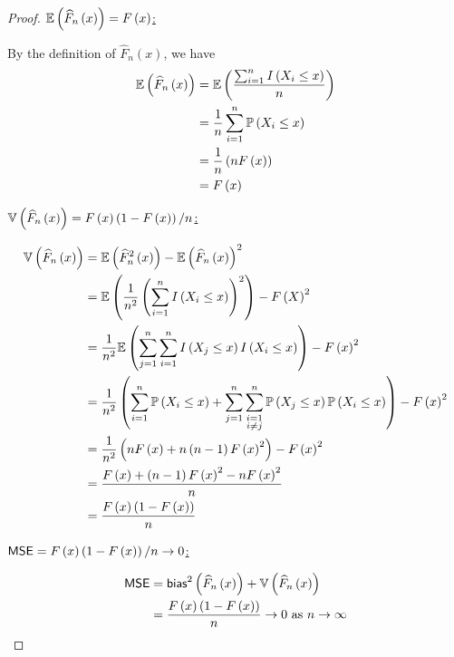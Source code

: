 \documentclass[a4paper]{article}
\begin{document}
\begin{proof}[Proof] 
\underline{\(\mathbb{E}\left( \widehat{F}_{n} \left( x \right)  \right) = F \left( x \right) \):}

By the definition of \(\widehat{F}_{n} \left( x \right) \), we have
\begin{align*}
	\mathbb{E}\left( \widehat{F}_{n} \left( x \right)  \right) & = \mathbb{E}\left( \frac{\sum_{i=1}^{n} I \left( X_{i} \le x \right) }{n} \right) \\
	 & = \frac{1}{n} \sum_{i=1}^{n} \mathbb{P}\left( X_{i} \le x  \right) \\ 
	 & = \frac{1}{n} \left( n F \left( x \right)  \right) \\
	 & = F \left( x \right) 
\end{align*}

\underline{\(\mathbb{V}\left( \widehat{F}_{n} \left( x \right)  \right) = F \left( x \right) \left( 1 - F \left( x \right)  \right) / n\):}

\begin{align*}
	\mathbb{V}\left( \widehat{F}_{n}\left( x \right)  \right) & = \mathbb{E}\left( \widehat{F}^{2}_{n}\left( x \right)  \right) - \mathbb{E}\left( \widehat{F}_{n} \left( x \right)  \right)^{2} \\
	 & = \mathbb{E}\left( \frac{1}{n^{2}} \left( \sum_{i=1}^{n} I \left( X_{i} \le x \right)  \right)^{2} \right) - F \left( X \right)^{2} \\ 
	 & = \frac{1}{n^{2}} \mathbb{E}\left( \sum_{j=1}^{n} \sum_{i=1}^{n} I \left( X_{j} \le x \right) I \left( X_{i} \le x \right)  \right) - F \left( x \right)^{2} \\
	 & = \frac{1}{n^{2}} \left( \sum_{i=1}^{n} \mathbb{P}\left( X_{i} \le x \right) + \sum_{j=1}^{n} \sum_{\substack{i = 1 \\ i \neq j}}^{n} \mathbb{P}\left( X_{j} \le x \right) \mathbb{P}\left( X_{i} \le x \right) \right)  - F \left( x \right)^{2}\\
	 & = \frac{1}{n^{2}} \left( n F \left( x \right) + n \left( n - 1 \right) F \left( x \right)^{2} \right) - F \left( x \right)^{2} \\
	 & = \frac{F \left( x \right) + \left( n-1 \right) F \left( x \right)^{2} - n F \left( x \right)^{2}}{n} \\
	 & = \frac{F \left( x \right) \left( 1 - F \left( x \right)  \right) }{n}
\end{align*}

\underline{\(\operatorname{\textsf{MSE}} = F \left( x \right) \left( 1 - F \left( x \right)  \right) / n \rightarrow 0\):}

\begin{align*}
	\operatorname{\textsf{MSE}}  & = \operatorname{\textsf{bias}}^{2} \left( \widehat{F}_{n} \left( x \right)  \right) + \mathbb{V}\left( \widehat{F}_{n} \left( x \right)  \right) \\
	 & = \frac{F \left( x \right) \left( 1 - F \left( x \right)  \right) }{n} \rightarrow 0 \text{ as } n \rightarrow \infty \\ 
\end{align*}


\end{proof}
\end{document}
